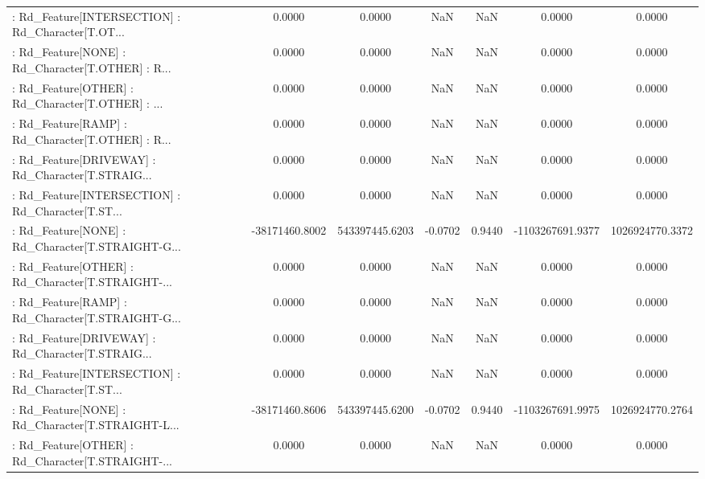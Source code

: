 \begin{longtable}{p{4cm}cccccc}
 : Rd\_Feature[INTERSECTION] : Rd\_Character[T.OT... &            0.0000 &            0.0000 &     NaN &          NaN &             0.0000 &            0.0000 \\
 : Rd\_Feature[NONE] : Rd\_Character[T.OTHER] : R... &            0.0000 &            0.0000 &     NaN &          NaN &             0.0000 &            0.0000 \\
 : Rd\_Feature[OTHER] : Rd\_Character[T.OTHER] : ... &            0.0000 &            0.0000 &     NaN &          NaN &             0.0000 &            0.0000 \\
 : Rd\_Feature[RAMP] : Rd\_Character[T.OTHER] : R... &            0.0000 &            0.0000 &     NaN &          NaN &             0.0000 &            0.0000 \\
 : Rd\_Feature[DRIVEWAY] : Rd\_Character[T.STRAIG... &            0.0000 &            0.0000 &     NaN &          NaN &             0.0000 &            0.0000 \\
 : Rd\_Feature[INTERSECTION] : Rd\_Character[T.ST... &            0.0000 &            0.0000 &     NaN &          NaN &             0.0000 &            0.0000 \\
 : Rd\_Feature[NONE] : Rd\_Character[T.STRAIGHT-G... &    -38171460.8002 &    543397445.6203 & -0.0702 &       0.9440 &   -1103267691.9377 &   1026924770.3372 \\
 : Rd\_Feature[OTHER] : Rd\_Character[T.STRAIGHT-... &            0.0000 &            0.0000 &     NaN &          NaN &             0.0000 &            0.0000 \\
 : Rd\_Feature[RAMP] : Rd\_Character[T.STRAIGHT-G... &            0.0000 &            0.0000 &     NaN &          NaN &             0.0000 &            0.0000 \\
 : Rd\_Feature[DRIVEWAY] : Rd\_Character[T.STRAIG... &            0.0000 &            0.0000 &     NaN &          NaN &             0.0000 &            0.0000 \\
 : Rd\_Feature[INTERSECTION] : Rd\_Character[T.ST... &            0.0000 &            0.0000 &     NaN &          NaN &             0.0000 &            0.0000 \\
 : Rd\_Feature[NONE] : Rd\_Character[T.STRAIGHT-L... &    -38171460.8606 &    543397445.6200 & -0.0702 &       0.9440 &   -1103267691.9975 &   1026924770.2764 \\
 : Rd\_Feature[OTHER] : Rd\_Character[T.STRAIGHT-... &            0.0000 &            0.0000 &     NaN &          NaN &             0.0000 &            0.0000 \\

\end{longtable}
